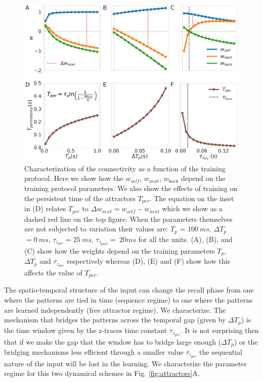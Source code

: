 \documentclass[10pt,a4paper]{article}
\begin{document}
\begin{figure}[H]
\centering
\includegraphics[scale=0.20]{training.pdf}
\caption{Characterization of the connectivity as a function of the training protocol. Here we show how the $w_{self}$, $w_{next}$, $w_{back}$ depend on the training protocol parameters. We also show the effects of training on the persistent time of the attractors $T_{per}$. The equation on the inset in (D) relates $T_{per}$ to $\Delta w_{next} = w_{self} - w_{next}$ which we show as a dashed red line on the top figure. When the parameters themselves are not subjected to variation their values are: $T_p$ = $100 \: ms$, $\Delta T_p$ $= 0 \: ms$, $\tau_{z_{pre}}  = 25 \: ms$, $\tau_{z_{post}}= \: 20 ms$ for all the units. (A), (B), and (C) show how the weights depend on the training parameters $T_p$, $\Delta T_p$ and $\tau_{z_{pre}}$ respectively whereas (D), (E) and (F) show how this affects the value of $T_{per}$.}
\label{fig:training}
\end{figure}


The spatio-temporal structure of the input can change the recall phase from one where the patterns are tied in time (sequence regime) to one where the patterns are learned independently (free attractor regime). We characterize. The mechanism that bridges the patterns across the temporal gap (given by $\Delta T_p$) is the time window given by the z-traces time constant $\tau_{z_{pre}}$. It is not surprising then that if we make the gap that the window has to bridge large enough ($\Delta T_p$) or the bridging mechanisms less efficient through a smaller value $\tau_{z_{pre}}$ the sequential nature of the input will be lost in the learning. We characterize the parameter regime for this two dynamical schemes in Fig. \ref{fig:attractors}A.  
\end{document}
